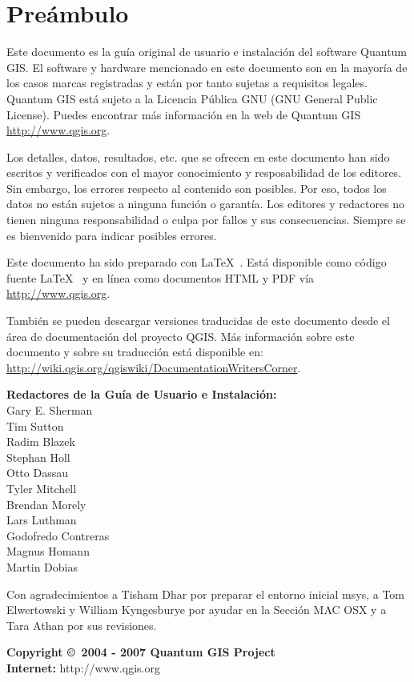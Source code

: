 \thispagestyle{empty}
\section*{Preámbulo}

\vspace{1cm}

Este documento es la guía original de usuario e instalación del 
software Quantum GIS. El software y hardware mencionado en este  
documento son en la mayoría de los casos marcas registradas y están por tanto sujetas  
a requisitos legales. Quantum GIS está sujeto a la Licencia Pública GNU (GNU General Public 
License). Puedes encontrar más información en la web de Quantum GIS \url{http://www.qgis.org}.

Los detalles, datos, resultados, etc. que se ofrecen en este documento han sido 
escritos y verificados con el mayor conocimiento y resposabilidad de los 
editores. Sin embargo, los errores respecto al contenido son posibles. 
Por eso, todos los datos no están sujetos a ninguna función o garantía. Los editores 
y redactores no tienen ninguna responsabilidad o culpa por fallos y 
sus consecuencias. Siempre se es bienvenido para indicar posibles errores.

Este documento ha sido preparado con \LaTeX~. Está disponible como código fuente \LaTeX~ 
 y en línea como documentos HTML y PDF vía \url{http://www.qgis.org}.

También se pueden descargar versiones traducidas de este documento desde el área de documentación 
del proyecto QGIS. Más información sobre este documento y sobre 
su traducción está disponible en: \\
\url{http://wiki.qgis.org/qgiswiki/DocumentationWritersCorner}.

\vspace{1cm}

\begin{flushleft}
\textbf{Redactores de la Guía de Usuario e Instalación:} 
\\ Gary E. Sherman 
\\ Tim Sutton 
\\ Radim Blazek 
\\ Stephan Holl 
\\ Otto Dassau 
\\ Tyler Mitchell 
\\ Brendan Morely 
\\ Lars Luthman 
\\ Godofredo Contreras 
\\ Magnus Homann
\\ Martin Dobias

Con agradecimientos a Tisham Dhar por preparar el entorno inicial msys, a Tom 
Elwertowski y William Kyngesburye por ayudar en la Sección MAC OSX y a Tara 
Athan por sus revisiones.

\vspace{1cm}

\textbf{Copyright \copyright~2004 - 2007 Quantum GIS Project} \\
\textbf{Internet:} http://www.qgis.org
\end{flushleft}

